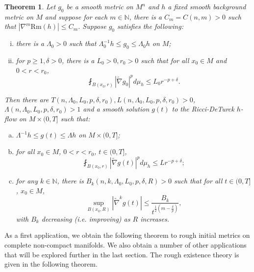 \documentclass[12pt]{amsart}
\theoremstyle{plain}
\newtheorem{theorem}[subsection]{Theorem}
\theoremstyle{plain}
\theoremstyle{definition}
\theoremstyle{remark}
\numberwithin{equation}{subsection}
\newcommand{\del}{\nabla}
\newcommand{\hdel}{\tilde{\nabla}}
\begin{document}
\begin{theorem}\label{thm:intro-main-theorem}
    Let $g_0$ be a smooth metric on $M^n$ and $h$ a fixed smooth background metric on $M$ and suppose for each $m \in \mathbb{N}$, there is a $C_m = C(n,m) > 0$ such that $|\del^m\text{Rm}(h)| \leq C_m$. Suppose $g_0$ satisfies the following:
    \begin{enumerate}[(i)]
        \item there is a $\Lambda_0 > 0$ such that $\Lambda_0^{-1}h \leq g_0 \leq \Lambda_0 h$ on $M$;
        \item for $p \geq 1, \delta > 0$, there is a $L_0 > 0, r_0 > 0$ such that for all $x_0 \in M$ and $0 < r < r_0$,
        \begin{equation*}
            \fint_{B(x_0,r)}|\hdel g_0|^p d\mu_h \leq L_0 r^{-p+\delta}.
        \end{equation*}
    \end{enumerate}
    Then there are $T(n, \Lambda_0, L_0, p, \delta, r_0), L(n, \Lambda_0, L_0, p, \delta, r_0) > 0$, $\Lambda(n, \Lambda_0, L_0, p, \delta, r_0) > 1$ and a smooth solution $g(t)$ to the Ricci-DeTurck $h$-flow on $M\times(0,T]$ such that:
        \begin{enumerate}[(a)]
            \item $\Lambda^{-1}h\leq g(t) \leq \Lambda h$ on $M\times(0,T]$;
            \item for all $x_0 \in M$, $0 < r < r_0$, $t \in (0, T]$,
            \begin{equation*}
                \fint_{B(x_0,r)} |\hdel g(t)|^p d\mu_h \leq L r^{-p+\delta};
            \end{equation*}
            \item for any $k \in \mathbb{N}$, there is $B_k(n, k, \Lambda_0, L_0, p, \delta, R) > 0$ such that for all $t \in (0, T]$, $x_0 \in M$,
            \begin{equation*}
                \sup\limits_{B(x_0, R)}|\hdel^k g(t)| \leq \frac{B_k}{t^{\frac{1}{2}(m-\frac{\delta}{p})}},
            \end{equation*}
            with $B_k$ decreasing (i.e. improving) as $R$ increases.
        \end{enumerate}
\end{theorem}

As a first application, we obtain the following theorem to rough initial metrics on complete non-compact manifolds. We also obtain a number of other applications that will be explored further in the last section. The rough existence theory is given in the following theorem.
\end{document}
